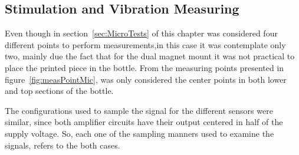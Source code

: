 \subsection{Stimulation and Vibration Measuring}
Even though in section~\ref{sec:MicroTests} of this chapter was considered four different points to perform measurements,in this case it was contemplate only two, mainly due the fact that for the dual magnet mount it was not practical to place the printed piece in the bottle. From the measuring points presented in figure~\ref{fig:measPointMic}, was only considered the center points in both lower and top sections of the bottle.

The configurations used to sample the signal for the different sensors were similar, since both amplifier circuits have their output centered in half of the supply voltage. So, each one of the sampling manners used to examine the signals, refers to the both cases. 

 
